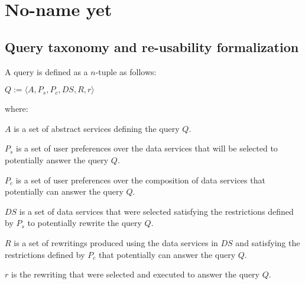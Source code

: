 \chapter{No-name yet}

\newpage

\section{Query taxonomy and re-usability formalization}

A query is defined as a $n$-tuple as follows:
%
\begin{center}
$Q := \langle A, P_{s}, P_{c}, DS, R, r  \rangle$
\end{center}
%
where:
\begin{description}
\item $A$ is a set of abstract services defining the query $Q$.
\item $P_{s}$ is a set of user preferences over the data services that will be selected to potentially answer the query $Q$.
\item $P_{c}$ is a set of user preferences over the composition of data services that potentially can answer the query $Q$.
\item $DS$ is a set of data services that were selected satisfying the restrictions defined by $P_{s}$ to potentially rewrite the query $Q$.
\item $R$ is a set of rewritings produced using the data services in $DS$ and satisfying the restrictions defined by $P_{c}$ that potentially can answer the query $Q$.
\item $r$ is the rewriting that were selected and executed to answer the query $Q$. 
\end{description} 

